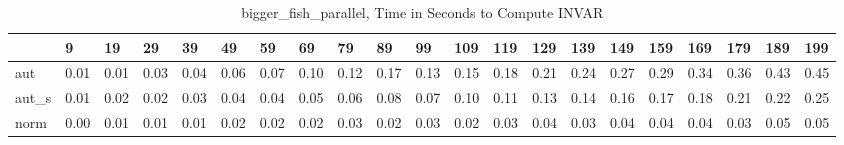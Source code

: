 \begin{table}
\caption{bigger_fish_parallel, Time in Seconds to Compute INVAR}
\label{bigger_fish_parallel_INVAR_time}
\begin{tabular}{lllllllllllllllllllll}
\toprule
 & 9 & 19 & 29 & 39 & 49 & 59 & 69 & 79 & 89 & 99 & 109 & 119 & 129 & 139 & 149 & 159 & 169 & 179 & 189 & 199 \\
\midrule
aut & 0.01 & 0.01 & 0.03 & 0.04 & 0.06 & 0.07 & 0.10 & 0.12 & 0.17 & 0.13 & 0.15 & 0.18 & 0.21 & 0.24 & 0.27 & 0.29 & 0.34 & 0.36 & 0.43 & 0.45 \\
aut_s & 0.01 & 0.02 & 0.02 & 0.03 & 0.04 & 0.04 & 0.05 & 0.06 & 0.08 & 0.07 & 0.10 & 0.11 & 0.13 & 0.14 & 0.16 & 0.17 & 0.18 & 0.21 & 0.22 & 0.25 \\
norm & 0.00 & 0.01 & 0.01 & 0.01 & 0.02 & 0.02 & 0.02 & 0.03 & 0.02 & 0.03 & 0.02 & 0.03 & 0.04 & 0.03 & 0.04 & 0.04 & 0.04 & 0.03 & 0.05 & 0.05 \\
\bottomrule
\end{tabular}
\end{table}
